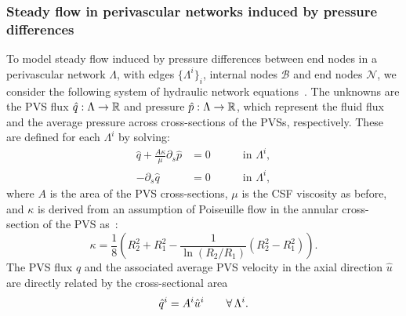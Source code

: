 \documentclass[fleqn,10pt]{wlscirep}
\begin{document}

\subsubsection{Steady flow in perivascular networks induced by pressure differences}
\label{sec:app:hydraulic_network}

To model steady flow induced by pressure differences between end nodes
in a perivascular network $\Lambda$, with edges $\{\Lambda^i\}_i$,
internal nodes $\mathcal{B}$ and end nodes $\mathcal{N}$, we consider
the following system of hydraulic network
equations~\cite{tithof2022network, daversin2022geometrically,
  gjerde2024directional}. The unknowns are the PVS flux $\hat{q} :
\Lambda \rightarrow \mathbb{R}$ and pressure $\hat{p} : \Lambda
\rightarrow \mathbb{R}$, which represent the fluid flux and the average
pressure across cross-sections of the PVSs, respectively. These are
defined for each $\Lambda^i$ by solving:
\begin{subequations}
\begin{alignat}{2}
  \hat{q} + \frac{A \kappa}{\mu} \partial_{s} \hat{p} & = 0 &&
  \quad \text{ in } \Lambda^i , \\ 
  - \partial_s \hat{q} & = 0 &&
  \quad \text{ in } \Lambda^i ,  
\end{alignat} 
\label{eq:1d_flow}%
\end{subequations}%
where $A$ is the area of the PVS cross-sections, $\mu$ is the CSF viscosity as before, and $\kappa$ is derived from an assumption of Poiseuille flow in the annular cross-section of the PVS as~\cite{tithof2022network}: 
\begin{equation}
\kappa = \frac18 \left( R_2^2 + R_1^2 - \frac{1}{\ln(R_2/R_1)} (R_2^2- R_1^2) \right). 
\end{equation}
The PVS flux $\hat{q}$ and the associated average PVS velocity in the
axial direction $\hat{u}$ are directly related by the cross-sectional area
\begin{equation}
  \hat{q}^i = A^i \hat{u}^i \qquad \forall \, \Lambda^i.
\end{equation}
\end{document}
